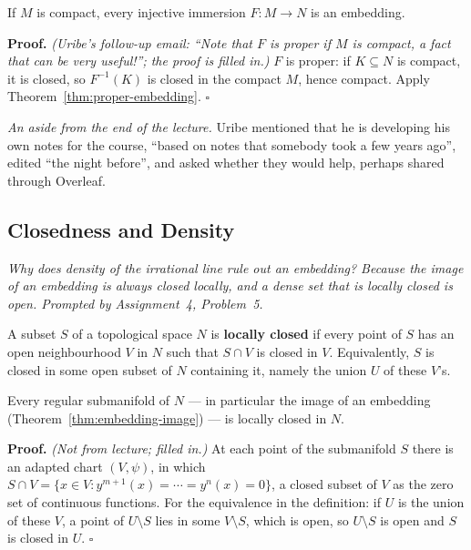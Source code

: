 \documentclass[11pt]{report}
\makeatletter
\newcounter{defcounter}[section]
\newcounter{thmcounter}[section]
\renewenvironment{proof}[1][Proof]{\noindent\textbf{#1.} }{\hfill$\square$\par\vspace{5pt}}
\newcommand{\thmlabel}[1]{\edef\@currentlabel{\arabic{section}.\arabic{thmcounter}}\label{#1}}
\newcommand{\deflabel}[1]{\edef\@currentlabel{\arabic{section}.\arabic{defcounter}}\label{#1}}
\newcommand{\leeref}[1]{\par\smallskip{\raggedleft\footnotesize\textsc{Lee}:\ #1\par}}
\makeatother
\begin{document}
\begin{corbox}\thmlabel{cor:compact-embedding}
If $M$ is compact, every injective immersion $F : M \to N$ is an embedding.
\leeref{Proposition 4.22}
\end{corbox}

\begin{proof}
\textit{(Uribe's follow-up email: ``Note that $F$ is proper if $M$ is compact, a fact that can be very useful!''; the proof is filled in.)} $F$ is proper: if $K \subseteq N$ is compact, it is closed, so $F^{-1}(K)$ is closed in the compact $M$, hence compact. Apply Theorem~\ref{thm:proper-embedding}.
\end{proof}

\textit{An aside from the end of the lecture.} Uribe mentioned that he is developing his own notes for the course, ``based on notes that somebody took a few years ago'', edited ``the night before'', and asked whether they would help, perhaps shared through Overleaf.

\subsection{Closedness and Density}\label{sub:closedness-density}

\textit{Why does density of the irrational line rule out an embedding? Because the image of an embedding is always closed \emph{locally}, and a dense set that is locally closed is open. Prompted by Assignment~4, Problem~5.}

\begin{defbox}\deflabel{def:locally-closed}
A subset $S$ of a topological space $N$ is \textbf{locally closed} if every point of $S$ has an open neighbourhood $V$ in $N$ such that $S \cap V$ is closed in $V$. Equivalently, $S$ is closed in some open subset of $N$ containing it, namely the union $U$ of these $V$'s.
\end{defbox}

\begin{propbox}\thmlabel{prop:embedding-locally-closed}
Every regular submanifold of $N$ --- in particular the image of an embedding (Theorem~\ref{thm:embedding-image}) --- is locally closed in $N$.
\end{propbox}

\begin{proof}
\textit{(Not from lecture; filled in.)} At each point of the submanifold $S$ there is an adapted chart $(V, \psi)$, in which $S \cap V = \{x \in V : y^{m+1}(x) = \cdots = y^n(x) = 0\}$, a closed subset of $V$ as the zero set of continuous functions. For the equivalence in the definition: if $U$ is the union of these $V$, a point of $U \setminus S$ lies in some $V \setminus S$, which is open, so $U \setminus S$ is open and $S$ is closed in $U$.
\end{proof}
\end{document}
